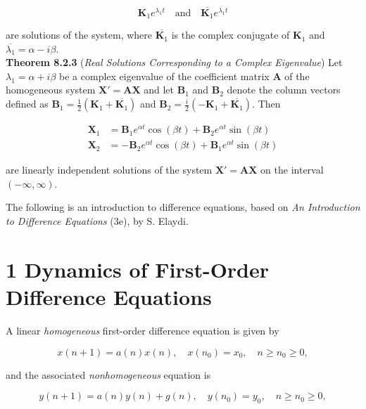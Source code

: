 \documentclass[12pt]{article}
\begin{document}
\begin{equation}
    \mathbf{K}_1 e^{\lambda_1 t} \quad \text{and} \quad \overline{\mathbf{K}_1} e^{\overline{\lambda_1} t}
\end{equation}

\noindent are solutions of the system, where \(\overline{\mathbf{K}_1}\) is the complex conjugate of \(\mathbf{K}_1\) and \(\overline{\lambda_1} = \alpha - i\beta\).\\

\noindent\textbf{Theorem 8.2.3} (\emph{Real Solutions Corresponding to a Complex Eigenvalue}) Let \(\lambda_1 = \alpha + i\beta\) be a complex eigenvalue of the coefficient matrix \(\mathbf{A}\) of the homogeneous system \(\mathbf{X'} = \mathbf{AX}\) and let \(\mathbf{B}_1\) and \(\mathbf{B}_2\) denote the column vectors defined as \(\mathbf{B}_1 = \frac{1}{2} \left(\mathbf{K}_1 + \overline{\mathbf{K}_1}\right)\) and \(\mathbf{B}_2 = \frac{i}{2} \left(-\mathbf{K}_1 + \overline{\mathbf{K}_1}\right)\). Then

\begin{align}
    \mathbf{X}_1 &= \mathbf{B}_1 e^{\alpha t} \cos(\beta t) + \mathbf{B}_2 e^{\alpha t} \sin(\beta t)\\
    \mathbf{X}_2 &= -\mathbf{B}_2 e^{\alpha t} \cos(\beta t) + \mathbf{B}_1 e^{\alpha t} \sin(\beta t)
\end{align}

\noindent are linearly independent solutions of the system \(\mathbf{X'} = \mathbf{AX}\) on the interval \((-\infty, \infty)\).

\newpage

The following is an introduction to difference equations, based on \emph{An Introduction to Difference Equations} (3e), by S. Elaydi.

\section*{1 Dynamics of First-Order Difference Equations}

A linear \emph{homogeneous} first-order difference equation is given by

\begin{equation}
    x(n+1) = a(n)x(n), \quad x(n_0) = x_0, \quad n \geq n_0 \geq 0, \label{eq:difference_homo}
\end{equation}

\noindent and the associated \emph{nonhomogeneous} equation is

\begin{equation}
    y(n+1) = a(n)y(n) + g(n), \quad y(n_0) = y_0, \quad n \geq n_0 \geq 0, \label{eq:difference_nonhomo}
\end{equation}
\end{document}
